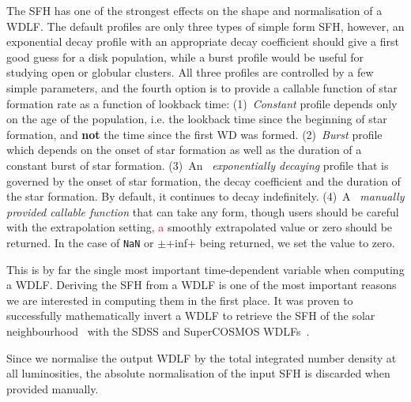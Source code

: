 \documentclass[fleqn,usenatbib]{rasti}
\begin{document}
The SFH has one of the strongest effects on the shape and normalisation of a
WDLF. The default profiles are only three types of simple form SFH, however,
an exponential decay profile with an appropriate decay coefficient should give a
first good guess for a disk population, while a burst profile would be useful
for studying open or globular clusters. All three profiles are controlled by
a few simple parameters, and the fourth option is to provide a callable
function of star formation rate as a function of lookback time:
(1)~\textit{Constant} profile depends only on the age of the population,
i.e. the lookback time since the beginning of star formation,
and \textbf{not} the time since the first WD was formed. (2)~\textit{Burst}
profile which depends on the onset of star formation as well as the duration
of a constant burst of star formation. (3)~An ~\textit{exponentially decaying}
profile that is governed by the onset of star formation, the decay coefficient
and the duration of the star formation. By default, it continues to decay
indefinitely. (4)~A ~\textit{manually provided callable function} that can take
any form, though users should be careful with the extrapolation setting,
\textcolor{red}{a} smoothly extrapolated value or zero should be returned. In
the case of \verb+NaN+ or $\pm$\vert+inf+ being returned, we set the value to zero.

This is by far the single most important time-dependent variable when
computing a WDLF. Deriving the SFH from a WDLF is one of the most important
reasons we are interested in computing them in the first place. It was proven
to successfully mathematically invert a WDLF to retrieve the SFH of the solar
neighbourhood~\citep{2013MNRAS.434.1549R} with the SDSS and SuperCOSMOS
WDLFs~\citep{2006AJ....132.1221H, 2011MNRAS.417...93R}.

Since we normalise the output WDLF by the total integrated number density at
all luminosities, the absolute normalisation of the input SFH is discarded when
provided manually.
\end{document}
